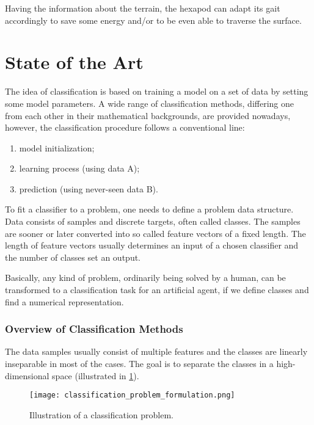 Having the information about the terrain, the hexapod can adapt its gait accordingly to save some energy and/or to be even able to traverse the surface.

\section{State of the Art} \label{sec:soa}
The idea of classification is based on training a model on a set of data by setting some model parameters. A wide range of classification methods, differing one from each other in their mathematical backgrounds, are provided nowadays, however, the classification procedure follows a conventional line:

\begin{enumerate}
\item model initialization;
\item learning process (using data A);
\item prediction (using never-seen data B).
\end{enumerate}

To fit a classifier to a problem, one needs to define a problem data structure. Data consists of samples and discrete targets, often called classes. The samples are sooner or later converted into so called feature vectors of a fixed length. The length of feature vectors usually determines an input of a chosen classifier and the number of classes set an output.

Basically, any kind of problem, ordinarily being solved by a human, can be transformed to a classification task for an artificial agent, if we define classes and find a numerical representation.

\subsubsection*{Overview of Classification Methods} \label{ssec:other_classification_methods}
The data samples usually consist of multiple features and the classes are linearly inseparable in most of the cases. The goal is to separate the classes in a high-dimensional space (illustrated in \cref{img:classification_problem_formulation}).

\begin{figure}[H]
  \centering
  \texttt{[image: classification\_problem\_formulation.png]}
  \caption{Illustration of a classification problem.}
  \label{img:classification_problem_formulation}
\end{figure}

